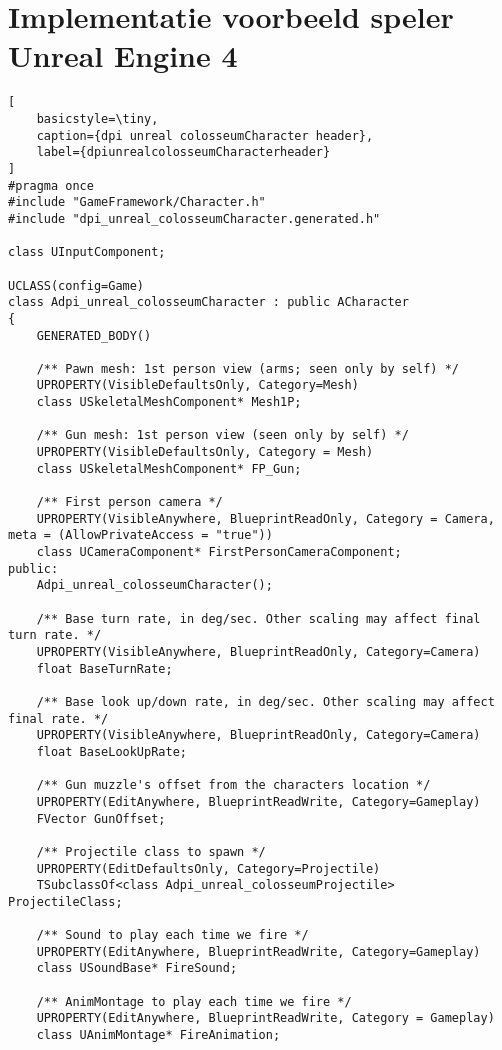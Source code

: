 \lstset {language=C++}

\chapter{Implementatie voorbeeld speler Unreal Engine 4}
\label{appendix:dpi_unreal_colosseumCharacter}

\begin{lstlisting}[
	basicstyle=\tiny, 
	caption={dpi unreal colosseumCharacter header}, 
	label={dpiunrealcolosseumCharacterheader}
]
#pragma once
#include "GameFramework/Character.h"
#include "dpi_unreal_colosseumCharacter.generated.h"

class UInputComponent;

UCLASS(config=Game)
class Adpi_unreal_colosseumCharacter : public ACharacter
{
	GENERATED_BODY()

	/** Pawn mesh: 1st person view (arms; seen only by self) */
	UPROPERTY(VisibleDefaultsOnly, Category=Mesh)
	class USkeletalMeshComponent* Mesh1P;

	/** Gun mesh: 1st person view (seen only by self) */
	UPROPERTY(VisibleDefaultsOnly, Category = Mesh)
	class USkeletalMeshComponent* FP_Gun;

	/** First person camera */
	UPROPERTY(VisibleAnywhere, BlueprintReadOnly, Category = Camera, meta = (AllowPrivateAccess = "true"))
	class UCameraComponent* FirstPersonCameraComponent;
public:
	Adpi_unreal_colosseumCharacter();

	/** Base turn rate, in deg/sec. Other scaling may affect final turn rate. */
	UPROPERTY(VisibleAnywhere, BlueprintReadOnly, Category=Camera)
	float BaseTurnRate;

	/** Base look up/down rate, in deg/sec. Other scaling may affect final rate. */
	UPROPERTY(VisibleAnywhere, BlueprintReadOnly, Category=Camera)
	float BaseLookUpRate;

	/** Gun muzzle's offset from the characters location */
	UPROPERTY(EditAnywhere, BlueprintReadWrite, Category=Gameplay)
	FVector GunOffset;

	/** Projectile class to spawn */
	UPROPERTY(EditDefaultsOnly, Category=Projectile)
	TSubclassOf<class Adpi_unreal_colosseumProjectile> ProjectileClass;

	/** Sound to play each time we fire */
	UPROPERTY(EditAnywhere, BlueprintReadWrite, Category=Gameplay)
	class USoundBase* FireSound;

	/** AnimMontage to play each time we fire */
	UPROPERTY(EditAnywhere, BlueprintReadWrite, Category = Gameplay)
	class UAnimMontage* FireAnimation;


\end{lstlisting}

